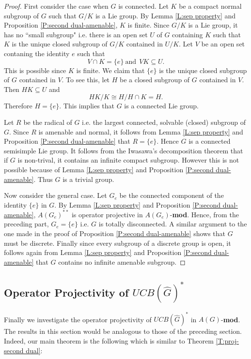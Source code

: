 \documentclass[10pt]{amsart}
\numberwithin{thm}{section}
\numberwithin{equation}{section}
\begin{document}
\begin{proof}
First consider the case when $G$ is connected. Let $K$ be a compact normal subgroup of $G$ such that
$G/K$ is a Lie group. By Lemma \ref{L:sep property} and Proposition \ref{P:second dual-amenable},
$K$ is finite. Since $G/K$ is a Lie group, it has no ``small subgroup" i.e. there is an open
set $U$ of $G$ containing $K$ such that $K$ is the unique closed subgroup of $G/K$ contained in $U/K$. Let $V$ be an open
set contaning the identity $e$ such that 
$$V\cap K=\{e\} \ \text{and} \ \ VK\subseteq U.$$
This is possible since $K$ is finite. We claim that $\{ e\}$ is the unique closed subgroup of $G$ contained in $V$.
To see this, let $H$ be a closed subgroup of $G$ contained in $V$. Then $HK\subseteq U$ and 
$$ HK/K\cong H/H\cap K=H.$$
Therefore $H=\{e\}$. This implies that $G$ is a connected Lie group.

Let $R$ be the radical of $G$ i.e. the largest connected, solvable (closed) subgroup of 
$G$. Since $R$ is amenable and normal, it follows from Lemma \ref{L:sep property} and Proposition
\ref{P:second dual-amenable} that $R=\{e\}$. Hence $G$ is a connected semisimple Lie group.
It follows from the Iwasawa's decomposition theorem that if $G$ is non-trival, it
contains an infinite compact subgroup. However this is not possible because of 
Lemma \ref{L:sep property} and Proposition \ref{P:second dual-amenable}. Thus $G$ is a trivial group.   

Now consider the general case. Let $G_e$ be the connected component of the identity $\{e\}$ in $G$.
By Lemma \ref{L:sep property} and Proposition \ref{P:second dual-amenable}, $A(G_e)^{**}$ is operator projective in $A(G_e)$-{\textbf{mod}}. Hence, from the preceding part, $G_e=\{e\}$ i.e. $G$ is totally disconnected. A similar argument
to the one made in the proof of Proposition \ref{P:second dual-amenable} shows that $G$ must be discrete.
Finally since every subgroup of a discrete group is open, it follows again from Lemma \ref{L:sep property} and Proposition \ref{P:second dual-amenable} that $G$ contains no infinite amenable subgroup.
\end{proof}

\subsection{Operator Projectivity of $UCB(\widehat{G})^*$}

Finally we investigate the operator projectivity of $UCB(\widehat{G})^*$ in $A(G)$-{\textbf{mod}}.
The results in this section would be analogous to those of the preceding section. 
Indeed, our main theorem is the following which is similar to Theorem \ref{T:proj-second dual}:
\end{document}
